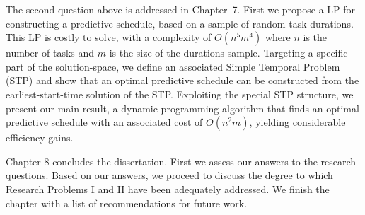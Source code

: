 The second question above is addressed in Chapter~7.
First we propose a LP for constructing a predictive schedule, based on a sample of random task durations.
This LP is costly to solve, with a complexity of $O(n^5 m^4)$ where $n$ is the number of tasks and $m$ is the size of the durations sample.
Targeting a specific part of the solution-space, 
we define an associated Simple Temporal Problem (STP) and show that an optimal 
predictive schedule can be constructed from the earliest-start-time solution of the STP.
Exploiting the special STP structure, we present our main result, 
a dynamic programming algorithm that finds an optimal predictive schedule with an associated cost of $O(n^2 m)$,
yielding considerable efficiency gains.
 
Chapter 8 concludes the dissertation.
First we assess our answers to the research questions.
Based on our answers, we proceed to discuss the degree to which Research Problems I and II have been adequately addressed.
We finish the chapter with a list of recommendations for future work.

